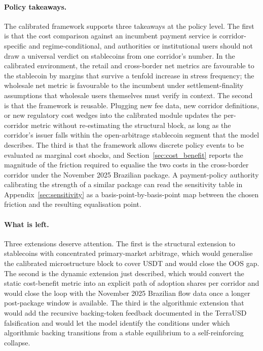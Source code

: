 \paragraph{Policy takeaways.} The calibrated framework supports three takeaways at the policy level. The first is that the cost comparison against an incumbent payment service is corridor-specific and regime-conditional, and authorities or institutional users should not draw a universal verdict on stablecoins from one corridor's number. In the calibrated environment, the retail and cross-border net metrics are favourable to the stablecoin by margins that survive a tenfold increase in stress frequency; the wholesale net metric is favourable to the incumbent under settlement-finality assumptions that wholesale users themselves must verify in context. The second is that the framework is reusable. Plugging new fee data, new corridor definitions, or new regulatory cost wedges into the calibrated module updates the per-corridor metric without re-estimating the structural block, as long as the corridor's issuer falls within the open-arbitrage stablecoin segment that the model describes. The third is that the framework allows discrete policy events to be evaluated as marginal cost shocks, and Section~\ref{sec:cost_benefit} reports the magnitude of the friction required to equalise the two costs in the cross-border corridor under the November 2025 Brazilian package. A payment-policy authority calibrating the strength of a similar package can read the sensitivity table in Appendix~\ref{sec:sensitivity} as a basis-point-by-basis-point map between the chosen friction and the resulting equalisation point.

\paragraph{What is left.} Three extensions deserve attention. The first is the structural extension to stablecoins with concentrated primary-market arbitrage, which would generalise the calibrated microstructure block to cover USDT and would close the OOS gap. The second is the dynamic extension just described, which would convert the static cost-benefit metric into an explicit path of adoption shares per corridor and would close the loop with the November 2025 Brazilian flow data once a longer post-package window is available. The third is the algorithmic extension that would add the recursive backing-token feedback documented in the TerraUSD falsification and would let the model identify the conditions under which algorithmic backing transitions from a stable equilibrium to a self-reinforcing collapse.
